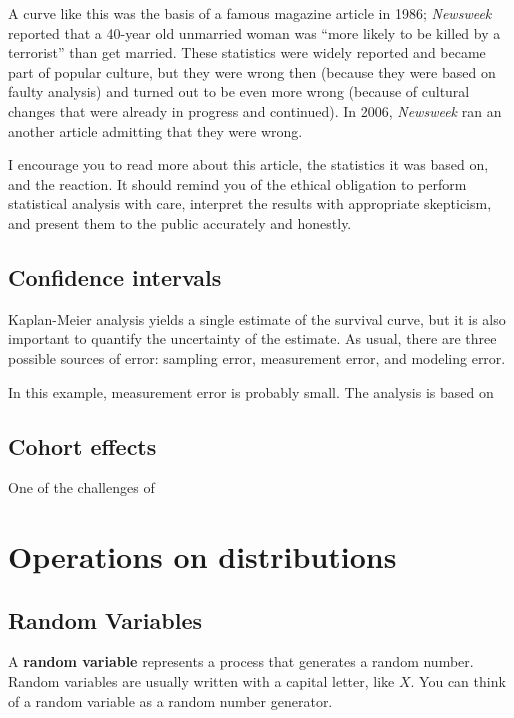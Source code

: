 \documentclass[12pt]{book}
\begin{document}
A curve like this was the basis of a famous magazine article in 1986;
{\it Newsweek} reported that a 40-year old unmarried woman was ``more
likely to be killed by a terrorist'' than get married.  These
statistics were widely reported and became part of popular culture,
but they were wrong then (because they were based on faulty analysis)
and turned out to be even more wrong (because of cultural changes that
were already in progress and continued).  In 2006, {\it Newsweek} ran
an another article admitting that they were wrong.

I encourage you to read more about this article, the statistics it was
based on, and the reaction.  It should remind you of the ethical
obligation to perform statistical analysis with care, interpret the
results with appropriate skepticism, and present them to the public
accurately and honestly.


\section{Confidence intervals}

Kaplan-Meier analysis yields a single estimate of the survival
curve, but it is also important to
quantify the uncertainty of the estimate.  As usual, there are
three possible sources of error: sampling error, measurement error,
and modeling error.

In this example, measurement error is probably small.  The analysis is
based on 



\section{Cohort effects}

One of the challenges of 




\chapter{Operations on distributions}
\label{operations}

\section{Random Variables}
 

A {\bf random variable} represents a process that generates a random
number.  Random variables are usually written with a capital letter,
like $X$.  You can think of a random variable as a random number
generator.
\end{document}
